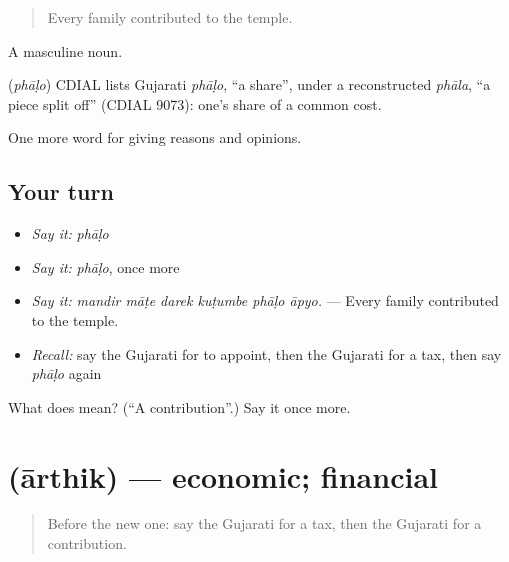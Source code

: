 \begin{quote}
Every family contributed to the temple.
\end{quote}

A masculine noun.

\begin{cousinweb}
\textbf{} (\emph{phāḷo}) CDIAL lists Gujarati \emph{phāḷo}, \textquotedblleft{}a share\textquotedblright{}, under a reconstructed \emph{phāla}, \textquotedblleft{}a piece split off\textquotedblright{} (CDIAL 9073): one's share of a common cost.
\end{cousinweb}

\begin{grammarlens}[title={What you've built}]
One more word for giving reasons and opinions.
\end{grammarlens}

\subsection*{Your turn}
\begin{itemize}
\raggedright
  \item \emph{Say it:} \emph{phāḷo}
  \item \emph{Say it:} \emph{phāḷo}, once more
  \item \emph{Say it:} \emph{mandir māṭe darek kuṭumbe phāḷo āpyo.} — Every family contributed to the temple.
  \item \emph{Recall:} say the Gujarati for to appoint, then the Gujarati for a tax, then say \emph{phāḷo} again
\end{itemize}

\begin{tcolorbox}[breakable,colback=teal!4,colframe=teal!35!black,title={Before you move on}]
What does  mean? (\textquotedblleft{}A contribution\textquotedblright{}.) Say it once more.
\end{tcolorbox}
\section[\texorpdfstring{\gu{આર્થિક} (ārthik)}{આર્થિક (ārthik)}]{ (ārthik) — economic; financial}

\label{lesson:GU-C355-arthik}



\begin{quote}
Before the new one: say the Gujarati for a tax, then the Gujarati for a contribution.
\end{quote}

